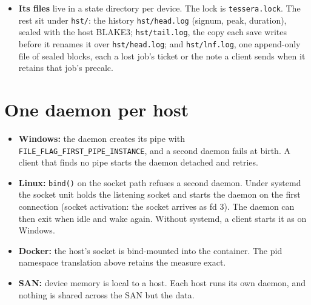 \begin{itemize}
\begin{itemize}
\item On each sweep it reads the device's memory and the job's pid, and warns if the job grew.
\item After every change it runs admission and tells each admitted client.
\item It retains each process's identity: a handle on Windows, a pidfd on Linux. A reused pid can never pass for the old process.
\end{itemize}
\item \textbf{Its files} live in a state directory per device. The lock is \texttt{tessera.\allowbreak{}lock}. The rest sit under \texttt{hst/\allowbreak{}}: the history \texttt{hst/\allowbreak{}head.\allowbreak{}log} (signum, peak, duration), sealed with the host BLAKE3; \texttt{hst/\allowbreak{}tail.\allowbreak{}log}, the copy each save writes before it renames it over \texttt{hst/\allowbreak{}head.\allowbreak{}log}; and \texttt{hst/\allowbreak{}lnf.\allowbreak{}log}, one append-only file of sealed blocks, each a lost job's ticket or the note a client sends when it retains that job's precalc.
\end{itemize}

\section{\texorpdfstring{One daemon per host}{One daemon per host}}

\begin{itemize}
\item \textbf{Windows:} the daemon creates its pipe with \texttt{FILE\_\allowbreak{}FLAG\_\allowbreak{}FIRST\_\allowbreak{}PIPE\_\allowbreak{}INSTANCE}, and a second daemon fails at birth. A client that finds no pipe starts the daemon detached and retries.
\item \textbf{Linux:} \texttt{bind()} on the socket path refuses a second daemon. Under systemd the socket unit holds the listening socket and starts the daemon on the first connection (socket activation: the socket arrives as fd 3). The daemon can then exit when idle and wake again. Without systemd, a client starts it as on Windows.
\item \textbf{Docker:} the host's socket is bind-mounted into the container. The pid namespace translation above retains the measure exact.
\item \textbf{SAN:} device memory is local to a host. Each host runs its own daemon, and nothing is shared across the SAN but the data.
\end{itemize}


